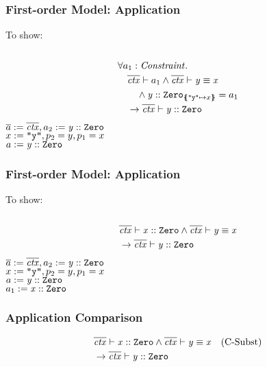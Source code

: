 \begin{frame}[t]
\frametitle{First-order Model: Application}
To show: 
\quad\\\quad\\
\begin{align*}
&\forall a_1: \Constr. \\
&\quad \entails{\ovl{\mIt{ctx}}}{a_1}
         \land \entails{\ovl{\mIt{ctx}}}{\pathEq{y}{x}}\\
&\qquad  \land \instOf{y}{\texttt{Zero}}_{\sub{\str y}{x}} = a_1\\
&\quad   \rightarrow \entails{\ovl{\mIt{ctx}}}{\instOf{y}{\texttt{Zero}}}
\end{align*}
$\ovl a := \ovl{\mIt{ctx}}, a_2 := \instOf{y}{\texttt{Zero}}$\\
$x := \str y, p_2 = y, p_1 = x$\\
$a := \instOf{y}{\texttt{Zero}}$\\
\pause
{}
\end{frame}

\begin{frame}[t]
\frametitle{First-order Model: Application}
To show: 
\quad\\\quad\\
\begin{align*}
&\entails{\ovl{\mIt{ctx}}}{\instOf{x}{\texttt{Zero}}}
         \land \entails{\ovl{\mIt{ctx}}}{\pathEq{y}{x}}\\
&\rightarrow \entails{\ovl{\mIt{ctx}}}{\instOf{y}{\texttt{Zero}}}
\end{align*}
$\ovl a := \ovl{\mIt{ctx}}, a_2 := \instOf{y}{\texttt{Zero}}$\\
$x := \str y, p_2 = y, p_1 = x$\\
$a := \instOf{y}{\texttt{Zero}}$\\
$a_1 := \instOf{x}{\texttt{Zero}}$
\end{frame}

\begin{frame}
\frametitle{Application Comparison}
\begin{prooftree}
\end{prooftree}
\vfill
\begin{align*}
&\entails{\ovl{\mIt{ctx}}}{\instOf{x}{\texttt{Zero}}}
         \land \entails{\ovl{\mIt{ctx}}}{\pathEq{y}{x}} && \text{(C-Subst)}\\
&\rightarrow \entails{\ovl{\mIt{ctx}}}{\instOf{y}{\texttt{Zero}}}
\end{align*}
\end{frame}
